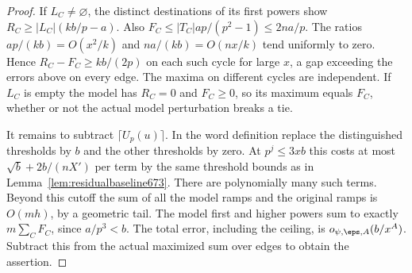 \documentclass[a4paper,11pt]{article}
\theoremstyle{definition}
\theoremstyle{remark}
\numberwithin{equation}{section}
\begin{document}
\begin{proof}
If \(L_C\ne\varnothing\), the distinct destinations of its first
powers show \(R_C\ge |L_C|(kb/p-a)\). Also
\(F_C\le |T_C|a p/(p^2-1)\le2na/p\). The ratios
\(ap/(kb)=O(x^2/k)\) and \(na/(kb)=O(nx/k)\) tend uniformly
to zero. Hence \(R_C-F_C\ge kb/(2p)\) on each such cycle for
large \(x\), a gap exceeding the errors above on every edge.
The maxima on different cycles are independent. If \(L_C\) is empty
the model has \(R_C=0\) and \(F_C\ge0\), so its maximum equals
\(F_C\), whether or not the actual model perturbation breaks a tie.

It remains to subtract \(\lceil U_p(u)\rceil\). In the word
definition replace the distinguished thresholds by \(b\) and
the other thresholds by zero. At \(p^j\le3xb\) this costs at
most \(\sqrt b+2b/(nX')\) per term by the same threshold bounds
as in Lemma~\ref{lem:residualbaseline673}. There are polynomially
many such terms. Beyond this cutoff the sum of all the model
ramps and the original ramps is \(O(mh)\), by a geometric tail.
The model first and higher powers sum to exactly \(m\sum_C F_C\),
since \(a/p^3<b\). The total error, including the ceiling, is
\(o_{\psi,\eps,A}(b/x^A)\). Subtract this from the actual
maximized sum over edges to obtain the assertion.
\end{proof}
\end{document}
